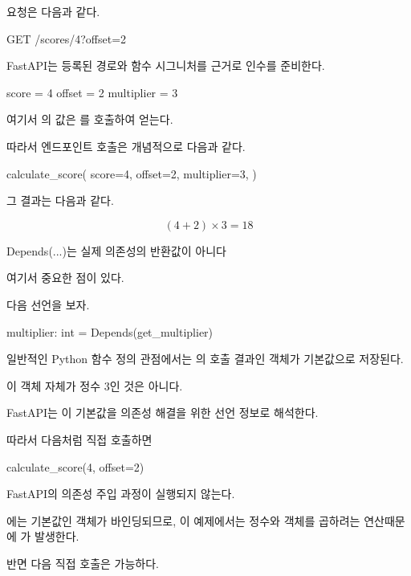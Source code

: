요청은 다음과 같다.

\begin{dhkzsh}
GET /scores/4?offset=2
\end{dhkzsh}

FastAPI는 등록된 경로와 함수 시그니처를 근거로 인수를 준비한다.

\begin{dhkzsh}
score = 4
offset = 2
multiplier = 3
\end{dhkzsh}

여기서 의 값은 를 호출하여 얻는다.

따라서 엔드포인트 호출은 개념적으로 다음과 같다.

\begin{dhkcode}
calculate_score(
    score=4,
    offset=2,
    multiplier=3,
)
\end{dhkcode}

그 결과는 다음과 같다.

\[
(4+2)\times3=18
\]

\begin{dhknote}
\begin{dhksmry}[centered]
Depends(...)는 실제 의존성의 반환값이 아니다
\end{dhksmry}
\end{dhknote}

여기서 중요한 점이 있다.

다음 선언을 보자.

\begin{dhkcode}
multiplier: int = Depends(get_multiplier)
\end{dhkcode}

일반적인 Python 함수 정의 관점에서는 의 호출 결과인  객체가 기본값으로 저장된다.

이 객체 자체가 정수 3인 것은 아니다.

FastAPI는 이 기본값을 의존성 해결을 위한 선언 정보로 해석한다.

따라서 다음처럼 직접 호출하면

\begin{dhkcode}
calculate_score(4, offset=2)
\end{dhkcode}

FastAPI의 의존성 주입 과정이 실행되지 않는다.

에는 기본값인  객체가 바인딩되므로, 이 예제에서는 정수와  객체를 곱하려는 연산때문에 가 발생한다.

반면 다음 직접 호출은 가능하다.

